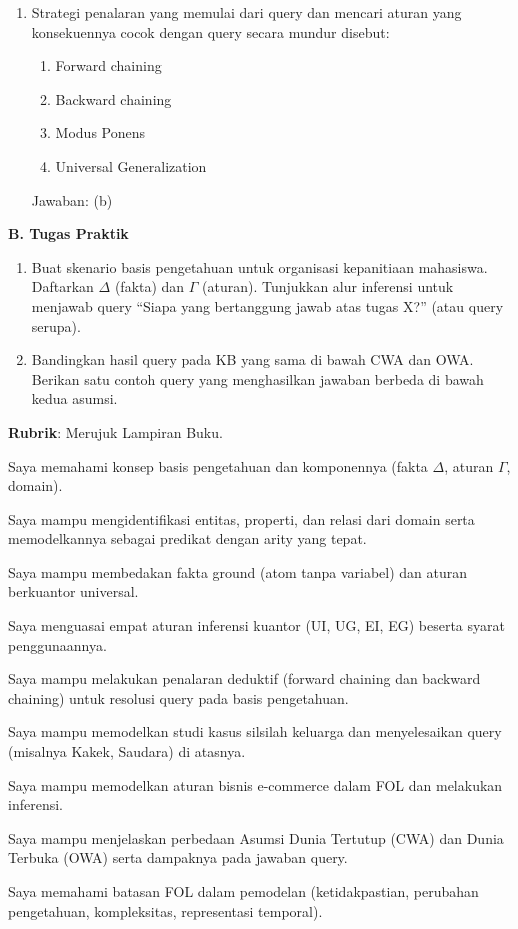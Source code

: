 \documentclass[../main]{subfiles}
\begin{document}
\begin{asesmen}
\begin{enumerate}
  \item Strategi penalaran yang memulai dari query dan mencari aturan yang konsekuennya cocok dengan query secara mundur disebut:
  \begin{enumerate}
    \item Forward chaining
    \item Backward chaining
    \item Modus Ponens
    \item Universal Generalization
  \end{enumerate}
  Jawaban: (b)
\end{enumerate}

\textbf{B. Tugas Praktik}
\begin{enumerate}
  \item Buat skenario basis pengetahuan untuk organisasi kepanitiaan mahasiswa. Daftarkan $\Delta$ (fakta) dan $\Gamma$ (aturan). Tunjukkan alur inferensi untuk menjawab query ``Siapa yang bertanggung jawab atas tugas X?'' (atau query serupa).
  \item Bandingkan hasil query pada KB yang sama di bawah CWA dan OWA. Berikan satu contoh query yang menghasilkan jawaban berbeda di bawah kedua asumsi.
\end{enumerate}

\textbf{Rubrik}: Merujuk Lampiran Buku.
\end{asesmen}


\begin{checklist}
  \item Saya memahami konsep basis pengetahuan dan komponennya (fakta $\Delta$, aturan $\Gamma$, domain).
  \item Saya mampu mengidentifikasi entitas, properti, dan relasi dari domain serta memodelkannya sebagai predikat dengan arity yang tepat.
  \item Saya mampu membedakan fakta ground (atom tanpa variabel) dan aturan berkuantor universal.
  \item Saya menguasai empat aturan inferensi kuantor (UI, UG, EI, EG) beserta syarat penggunaannya.
  \item Saya mampu melakukan penalaran deduktif (forward chaining dan backward chaining) untuk resolusi query pada basis pengetahuan.
  \item Saya mampu memodelkan studi kasus silsilah keluarga dan menyelesaikan query (misalnya Kakek, Saudara) di atasnya.
  \item Saya mampu memodelkan aturan bisnis e-commerce dalam FOL dan melakukan inferensi.
  \item Saya mampu menjelaskan perbedaan Asumsi Dunia Tertutup (CWA) dan Dunia Terbuka (OWA) serta dampaknya pada jawaban query.
  \item Saya memahami batasan FOL dalam pemodelan (ketidakpastian, perubahan pengetahuan, kompleksitas, representasi temporal).
\end{checklist}
\end{document}
